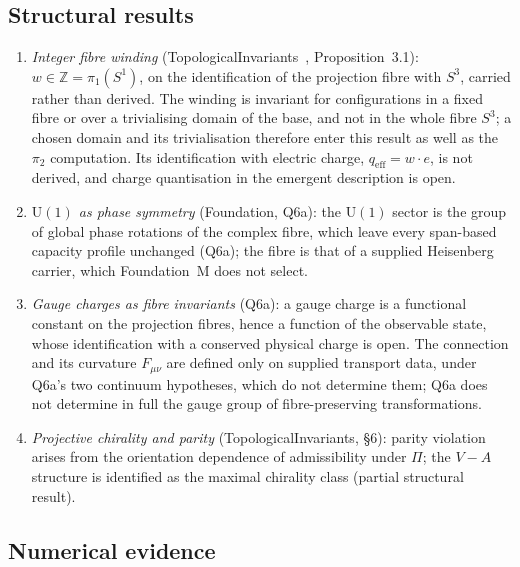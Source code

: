 \documentclass[11pt,a4paper]{article}
\theoremstyle{definition}
\newcommand{\UU}{\mathrm{U}}
\begin{document}
    \subsection{Structural results}
      \label{sec:structural}

      \begin{enumerate}
        \item \textit{Integer fibre winding}
        (TopologicalInvariants~\cite{Beau2026k}, Proposition~3.1):
        $w \in \mathbb{Z} = \pi_1(S^1)$, on the identification of the projection fibre with $S^3$,
        carried rather than derived.
        The winding is invariant for configurations in a fixed fibre or over a trivialising domain
        of the base, and not in the whole fibre $S^3$; a chosen domain and its trivialisation
        therefore enter this result as well as the $\pi_2$ computation.
        Its identification with electric charge, $q_{\mathrm{eff}} = w \cdot e$, is not derived, and
        charge quantisation in the emergent description is open.

        \item \textit{$\UU(1)$ as phase symmetry} (Foundation, Q6a):
        the $\UU(1)$ sector is the group of global phase rotations of the complex fibre, which
        leave every span-based capacity profile unchanged (Q6a); the fibre is that of a supplied
        Heisenberg carrier, which Foundation~M does not select.

        \item \textit{Gauge charges as fibre invariants} (Q6a): a gauge charge is a functional
        constant on the projection fibres, hence a function of the observable state, whose
        identification with a conserved physical charge is open.
        The connection and its curvature $F_{\mu\nu}$ are defined only on supplied transport data,
        under Q6a's two continuum hypotheses, which do not determine them; Q6a does not determine in
        full the gauge group of fibre-preserving transformations.

        \item \textit{Projective chirality and parity} (TopologicalInvariants, §6):
        parity violation arises from the orientation dependence of admissibility under $\Pi$;
        the $V - A$ structure is identified as the maximal chirality class
        (partial structural result).
      \end{enumerate}

    \subsection{Numerical evidence}
      \label{sec:numerical}
\end{document}
